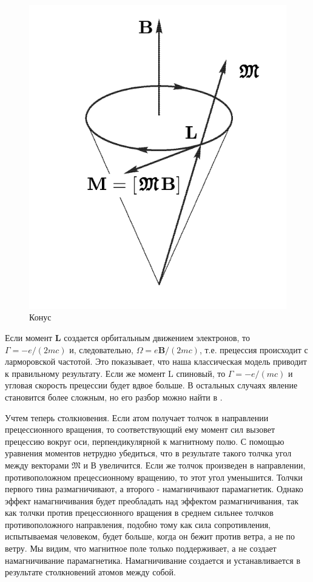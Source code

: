 \documentclass[12pt]{article}
\begin{document}
  \begin{figure}
    \centering
    \includegraphics[width=\linewidth]{conus.png}
    \caption{Конус}
    \label{fig:176}
  \end{figure}

  Если момент $\mathbf{L}$ создается орбитальным движением электронов, то $\Gamma=-e /(2 m c)$ и, следовательно, $\Omega=e \mathbf{B} /(2 m c)$, т.е. прецессия происходит с ларморовской частотой. Это показывает, что наша классическая модель приводит к правильному результату. Если же момент L спиновый, то $\Gamma=-e /(m c)$ и угловая скорость прецессии будет вдвое больше. В остальных случаях явление становится более сложным, но его разбор можно найти в \cite{sivykhin5}.

  Учтем теперь столкновения. Если атом получает толчок в направлении прецессионного вращения, то соответствующий ему момент сил вызовет прецессию вокруг оси, перпендикулярной к магнитному полю. С помощью уравнения моментов нетрудно убедиться, что в результате такого толчка угол между векторами $\mathfrak{M}$ и В увеличится. Если же толчок произведен в направлении, противоположном прецессионному вращению, то этот угол уменьшится. Толчки первого тина размагничивают, а второго - намагничивают парамагнетик. Однако эффект намагничивания будет преобладать над эффектом размагничивания, так как толчки против прецессионного вращения в среднем сильнее толчков противоположного направления, подобно тому как сила сопротивления, испытываемая человеком, будет больше, когда он бежит против ветра, а не по ветру. Мы видим, что магнитное поле только поддерживает, а не создает намагничивание парамагнетика. Намагничивание создается и устанавливается в результате столкновений атомов между собой.
\end{document}
